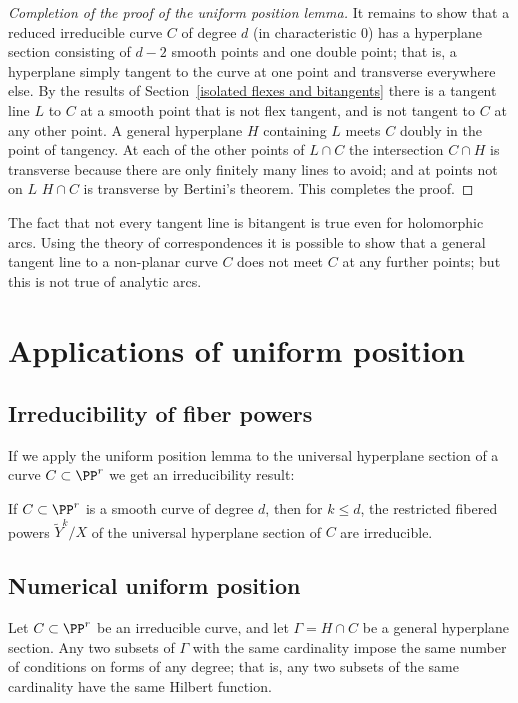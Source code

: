 \begin{proof}[Completion of the proof of the uniform position lemma]
 It remains to show that a reduced irreducible curve $C$ of degree $d$ (in characteristic 0)
 has a hyperplane section consisting of $d-2$ smooth points and one double point; that is, a hyperplane simply tangent to the curve at one point and transverse everywhere else. By the results of 
 Section~\ref{isolated flexes and bitangents} there is a tangent line $L$ to $C$ at a smooth point that is not flex tangent, and is not tangent to $C$ at any other point. A general hyperplane $H$ containing $L$ meets $C$ doubly in the point of
 tangency. At each of the other points of $L\cap C$ the intersection $C\cap H$ is transverse because there are only finitely many lines to avoid; and at points not on $L$ $H\cap C$ is transverse by Bertini's theorem. This completes the proof.
\end{proof}

\begin{remark}
 The fact that not every tangent line is bitangent is true
even for holomorphic arcs. Using the theory of correspondences it is possible to show that
a general tangent line to a non-planar curve $C$ does not meet $C$ at any further points; but
this is not true of analytic arcs.
\end{remark}

 \section{Applications of uniform position}
\subsection{Irreducibility of fiber powers}
If we apply the uniform position lemma to the universal hyperplane section of a curve $C \subset \PP^r$ we get an irreducibility result:

\begin{corollary}\label{hyperplane section monodromy} If $C\subset \PP^r$ is a smooth curve of degree $d$, then 
for $k\leq d$, the restricted fibered powers $\tilde Y^k/X$  of the universal hyperplane section 
of $C$ are irreducible.
\end{corollary}

\subsection{Numerical uniform position}
\begin{corollary}\label{numerical uniform position lemma}
Let $C\subset \PP^r$ be an irreducible curve, and let $\Gamma = H\cap C$ be a general hyperplane section. Any two subsets of $\Gamma$ with the same cardinality impose the same number of conditions on forms of any degree; that is, any two subsets of the same cardinality have the same Hilbert function.
\end{corollary}

